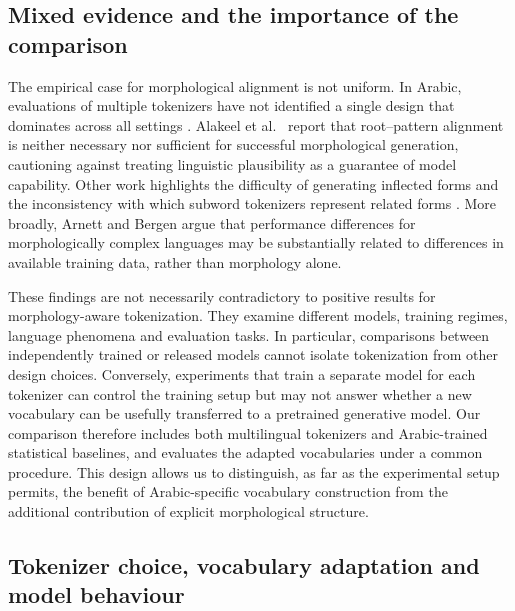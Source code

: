 \documentclass[a4paper,fleqn]{cas-sc}
\begin{document}
\subsection{Mixed evidence and the importance of the comparison}
\label{sec:related:against}

The empirical case for morphological alignment is not uniform. In Arabic, evaluations of multiple tokenizers have not identified a single design that dominates across all settings \citep{alyafeai2023evaluating}. Alakeel et al.\ \citep{alakeel2026morphemes} report that root--pattern alignment is neither necessary nor sufficient for successful morphological generation, cautioning against treating linguistic plausibility as a guarantee of model capability. Other work highlights the difficulty of generating inflected forms and the inconsistency with which subword tokenizers represent related forms \citep{reda2026yallamorph,dimarco2024subword}. More broadly, Arnett and Bergen \citep{arnett2025why} argue that performance differences for morphologically complex languages may be substantially related to differences in available training data, rather than morphology alone.

These findings are not necessarily contradictory to positive results for morphology-aware tokenization. They examine different models, training regimes, language phenomena and evaluation tasks. In particular, comparisons between independently trained or released models cannot isolate tokenization from other design choices. Conversely, experiments that train a separate model for each tokenizer can control the training setup but may not answer whether a new vocabulary can be usefully transferred to a pretrained generative model. Our comparison therefore includes both multilingual tokenizers and Arabic-trained statistical baselines, and evaluates the adapted vocabularies under a common procedure. This design allows us to distinguish, as far as the experimental setup permits, the benefit of Arabic-specific vocabulary construction from the additional contribution of explicit morphological structure.

\subsection{Tokenizer choice, vocabulary adaptation and model behaviour}
\label{sec:related:design}
\end{document}
